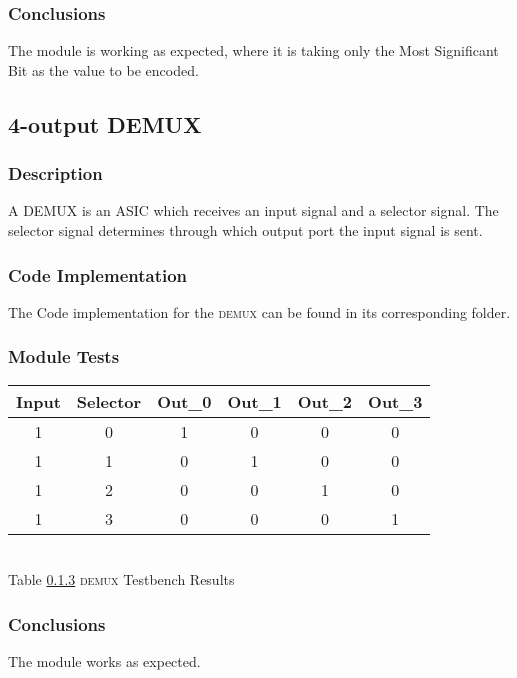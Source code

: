 \subsubsection{\color{orange}Conclusions}
The module is working as expected, where it is taking only the Most Significant Bit as the value to be encoded.

\subsection{\color{purple}4-output DEMUX}

\subsubsection{\color{orange}Description}
A DEMUX is an ASIC which receives an input signal and a selector signal. The selector signal determines through which output port the input signal is sent.

\subsubsection{\color{orange}Code Implementation}
The Code implementation for the \textsc{demux} can be found in its corresponding folder.

\subsubsection{\color{orange}Module Tests}
\label{subsec2}

\begin{center}
\begin{tabular}{|c|c|c|c|c|c|}
\hline
Input&Selector&Out\_0&Out\_1&Out\_2&Out\_3\\
\hline
1&0&1&0&0&0\\
1&1&0&1&0&0\\
1&2&0&0&1&0\\
1&3&0&0&0&1\\
\hline
\end{tabular}
\\\vspace{12pt}
Table \ref{subsec2} \textsc{demux} Testbench Results
\end{center}

\subsubsection{\color{orange}Conclusions}
The module works as expected.